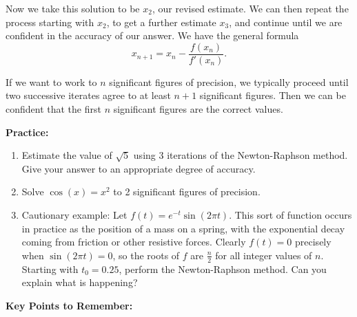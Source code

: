 \documentclass{article}
\begin{document}
\vfill


Now we take this solution to be $x_2$, our revised estimate. We can then repeat the process starting with $x_2$, to get a further estimate $x_3$, and continue until we are confident in the accuracy of our answer. We have the general formula
\[x_{n+1}=x_n-\frac{f(x_n)}{f'(x_n)}.\]

If we want to work to $n$ significant figures of precision, we typically proceed until two successive iterates agree to at least $n+1$ significant figures. Then we can be confident that the first $n$ significant figures are the correct values.





\clearpage











\textbf{Practice:}


\begin{enumerate}
	\item Estimate the value of $\sqrt{5}$ using 3 iterations of the Newton-Raphson method. Give your answer to an appropriate degree of accuracy.
	\item Solve $\cos(x)=x^2$ to 2 significant figures of precision.
	\item Cautionary example: Let $f(t)=e^{-t}\sin(2\pi t)$. This sort of function occurs in practice as the position of a mass on a spring, with the exponential decay coming from friction or other resistive forces. Clearly $f(t)=0$ precisely when $\sin(2\pi t)=0$, so the roots of $f$ are $\frac{n}{2}$ for all integer values of $n$. Starting with $t_0=0.25$, perform the Newton-Raphson method. Can you explain what is happening?
\end{enumerate}





\clearpage




{\bf Key Points to Remember:}

\vspace{5mm}
\end{document}
